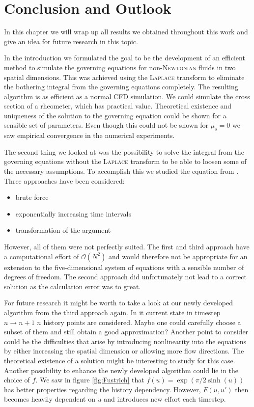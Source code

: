 \documentclass[12pt,a4paper,twoside, open=right]{scrreprt}
\theoremstyle{definition}
\theoremstyle{plain}
\begin{document}
\chapter{Conclusion and Outlook}
In this chapter we will wrap up all results we obtained throughout this work and give an idea for future research in this topic. \par 
In the introduction we formulated the goal to be the development of an efficient method to simulate the governing equations for non-\textsc{Newtonian} fluids in two spatial dimensions. This was achieved using the \textsc{Laplace} transform to eliminate the bothering integral from the governing equations completely. The resulting algorithm is as efficient as a normal CFD simulation. We could simulate the cross section of a rheometer, which has practical value. Theoretical existence and uniqueness of the solution to the governing equation could be shown for a sensible set of parameters. Even though this could not be shown for $\mu_s=0$ we saw empirical convergence in the numerical experiments. \par 
The second thing we looked at was the possibility to solve the integral from the governing equations without the \textsc{Laplace} transform to be able to loosen some of the necessary assumptions. To accomplish this we studied the equation from \cite{Gnann2012}. Three approaches have been considered:
\begin{itemize}
    \item brute force
    \item exponentially increasing time intervals
    \item transformation of the argument
\end{itemize}
However, all of them were not perfectly suited. The first and third approach have a computational effort of $\mathcal{O}(N^2)$ and would therefore not be appropriate for an extension to the five-dimensional system of equations with a sensible number of degrees of freedom. The second approach did unfortunately not lead to a correct solution as the calculation error was to great. \\
\par 
For future research it might be worth to take a look at our newly developed algorithm from the third approach again. In it current state in timestep $n\to n+1$ $n$ history points are considered. Maybe one could carefully choose a subset of them and still obtain a good approximation? Another point to consider could be the difficulties that arise by introducing nonlinearity into the equations by either increasing the spatial dimension or allowing more flow directions. The theoretical existence of a solution might be interesting to study for this case. Another possibility to enhance the newly developed algorithm could lie in the choice of $f$. We saw in figure \ref{fig:Fustrich} that $f(u)=\exp(\pi/2\sinh(u))$ has better properties regarding the history dependency. However, $F(u,u')$ then becomes heavily dependent on $u$ and introduces new effort each timestep.\\
\end{document}
